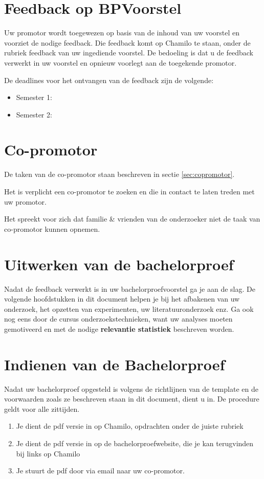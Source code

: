 \section{Feedback op BPVoorstel}
Uw promotor wordt toegewezen op basis van de inhoud van uw voorstel en voorziet de nodige feedback. Die feedback komt op Chamilo te staan, onder de rubriek feedback van uw ingediende voorstel. De bedoeling is dat u de feedback verwerkt in uw voorstel en opnieuw voorlegt aan de toegekende promotor.

De deadlines voor het ontvangen van de feedback zijn de volgende:
\begin{framed}
\begin{itemize}
	\item Semester 1: \feedbackVoorstelSemEen{}
	\item Semester 2: \feedbackVoorstelSemTwee{}
\end{itemize}
\end{framed}

\section{Co-promotor}
De taken van de co-promotor staan beschreven in sectie \ref{sec:copromotor}.


\begin{framed}
Het is verplicht een co-promotor te zoeken en die in contact te laten treden met uw promotor. 

Het spreekt voor zich dat familie \& vrienden van de onderzoeker niet de taak van co-promotor kunnen opnemen.
\end{framed}

\section{Uitwerken van de bachelorproef}
Nadat de feedback verwerkt is in uw bachelorproefvoorstel ga je aan de slag. De volgende hoofdstukken in dit document helpen je bij het afbakenen van uw onderzoek, het opzetten van experimenten, uw literatuuronderzoek enz. Ga ook  nog eens door de cursus onderzoekstechnieken, want uw analyses moeten gemotiveerd en met de nodige \textbf{relevantie statistiek} beschreven worden.

\section{Indienen van de Bachelorproef}
Nadat uw bachelorproef opgesteld is volgens de richtlijnen van de template en de voorwaarden zoals ze beschreven staan in dit document, dient u in. De procedure geldt voor alle zittijden.
\begin{enumerate}
	\item Je dient de pdf versie in op Chamilo, opdrachten onder de juiste rubriek 
	\item Je dient de pdf versie in op de bachelorproefwebsite, die je kan terugvinden bij links op Chamilo 
	\item Je stuurt de pdf door via email naar uw co-promotor. 
\end{enumerate}

